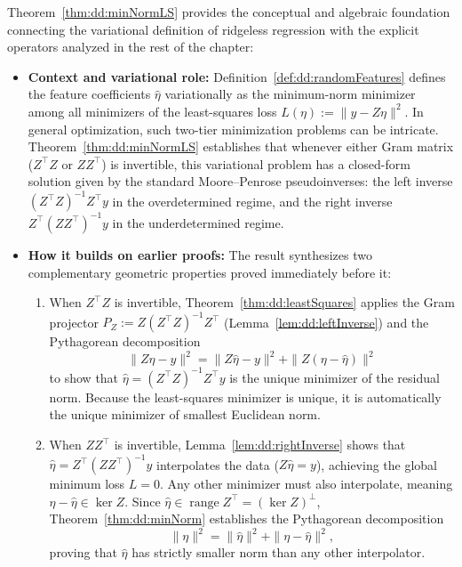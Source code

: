 \begin{remark}\label{rmk:dd:minNormLSContext}
Theorem~\ref{thm:dd:minNormLS} provides the conceptual and algebraic foundation connecting the variational definition of ridgeless regression with the explicit operators analyzed in the rest of the chapter:
\begin{itemize}
  \item \textbf{Context and variational role:}
  Definition~\ref{def:dd:randomFeatures} defines the feature coefficients $\hat\eta$ variationally as the minimum-norm minimizer among all minimizers of the least-squares loss $L(\eta):=\|y-Z\eta\|^2$. In general optimization, such two-tier minimization problems can be intricate. 
  Theorem~\ref{thm:dd:minNormLS} establishes that whenever either Gram matrix ($Z^\top Z$ or $ZZ^\top$) is invertible, this variational problem has a closed-form solution 
  given by the standard Moore--Penrose pseudoinverses: the left inverse $(Z^\top Z)^{-1}Z^\top y$ in the overdetermined regime, 
  and the right inverse $Z^\top(ZZ^\top)^{-1}y$ in the underdetermined regime.

  \item \textbf{How it builds on earlier proofs:}
  The result synthesizes two complementary geometric properties proved immediately before it:
  \begin{enumerate}
    \item When $Z^\top Z$ is invertible, Theorem~\ref{thm:dd:leastSquares} applies the Gram projector $P_Z:=Z(Z^\top Z)^{-1}Z^\top$ (Lemma~\ref{lem:dd:leftInverse}) and the Pythagorean decomposition
    \[
      \|Z\eta-y\|^2 = \|Z\hat\eta-y\|^2 + \|Z(\eta-\hat\eta)\|^2
    \]
    to show that $\hat\eta=(Z^\top Z)^{-1}Z^\top y$ is the unique minimizer of the residual norm. Because the least-squares minimizer is unique, it is automatically the unique minimizer of smallest Euclidean norm.
    \item When $ZZ^\top$ is invertible, Lemma~\ref{lem:dd:rightInverse} shows that $\hat\eta=Z^\top(ZZ^\top)^{-1}y$ interpolates the data ($Z\hat\eta=y$), achieving the global minimum loss $L=0$. Any other minimizer must also interpolate, meaning $\eta-\hat\eta\in\ker Z$. Since $\hat\eta\in\operatorname{range}Z^\top=(\ker Z)^\perp$, Theorem~\ref{thm:dd:minNorm} establishes the Pythagorean decomposition
    \[
      \|\eta\|^2 = \|\hat\eta\|^2 + \|\eta-\hat\eta\|^2,
    \]
    proving that $\hat\eta$ has strictly smaller norm than any other interpolator.
  \end{enumerate}


\end{itemize}
\end{remark}

